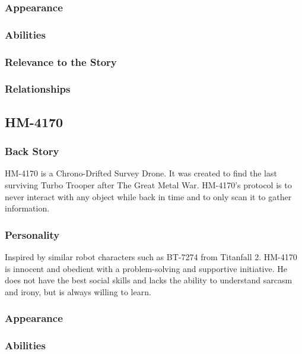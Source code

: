 \documentclass[12pt]{article}
\begin{document}
\subsubsection{Appearance}

\subsubsection{Abilities}

\subsubsection{Relevance to the Story}

\subsubsection{Relationships}

\subsection{HM-4170}

\subsubsection{Back Story}

HM-4170 is a Chrono-Drifted Survey Drone. It was created to find the last surviving Turbo Trooper after The Great Metal War. HM-4170's protocol is to never interact with any object while back in time and to only scan it to gather information.

\subsubsection{Personality}

Inspired by similar robot characters such as BT-7274 from Titanfall 2. HM-4170 is innocent and obedient with a problem-solving and supportive initiative. He does not have the best social skills and lacks the ability to understand sarcasm and irony, but is always willing to learn.

\subsubsection{Appearance}

\subsubsection{Abilities}
\end{document}
